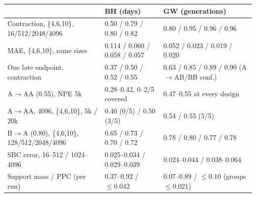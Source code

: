 \documentclass[10pt,a4paper]{article}
\newcommand{\blk}[1]{\par\needspace{5\baselineskip}\smallskip{\sffamily\bfseries\color{inkgray}#1}\par}
\newcommand{\Comment}{\blk{Comment}}
\begin{document}
\begin{center}
\medskip
\begin{tabular}{@{}lll@{}}\toprule
 & \textbf{BH} (days) & \textbf{GW} (generations) \\\midrule
Contraction, \{4,6,10\}, 16/512/2048/4096 & 0.50 / 0.79 / 0.80 / 0.82 & 0.80 / 0.95 / 0.96 / 0.96 \\
MAE, \{4,6,10\}, same sizes & 0.114 / 0.060 / 0.058 / 0.057 & 0.052 / 0.023 / 0.019 / 0.020 \\
One late endpoint, contraction & 0.37 / 0.50 / 0.52 / 0.55 & 0.63 / 0.85 / 0.89 / 0.90 (A$\to$AB/BB conf.) \\
A$\to$AA (0.55), NPE 5k & 0.28--0.42, 0--2/5 covered & 0.47--0.55 at every design \\
A$\to$AA, 4096, \{4,6,10\}, 5k / 20k & 0.40 (0/5) / 0.50 (3/5) & 0.54 / 0.55 (5/5) \\
B$\to$A (0.80), \{4,6,10\}, 128/512/2048/4096 & 0.65 / 0.73 / 0.70 / 0.72 & 0.78 / 0.80 / 0.77 / 0.78 \\
SBC error, 16--512 / 1024--4096 & 0.025--0.034 / 0.029--0.039 & 0.024--0.044 / 0.038--0.064 \\
Support mass / PPC (per run) & 0.37--0.92 / $\le 0.042$ & 0.07--0.89 / $\le 0.10$ (groups $\le 0.021$) \\\bottomrule
\end{tabular}
\end{center}
\Comment
\end{document}
